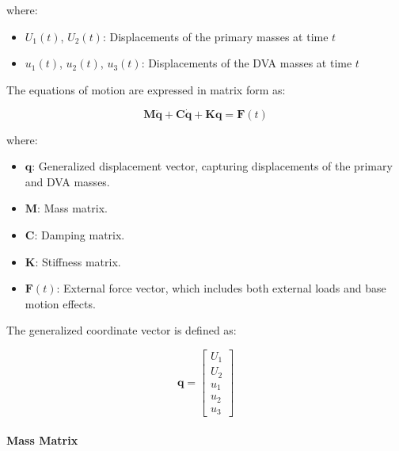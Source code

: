 \documentclass[12pt,a4paper]{article}
\begin{document}
where:
\begin{itemize}
    \item $U_1(t)$, $U_2(t)$: Displacements of the primary masses at time $t$
    \item $u_1(t)$, $u_2(t)$, $u_3(t)$: Displacements of the DVA masses at time $t$
\end{itemize}

The equations of motion are expressed in matrix form as:

\begin{equation} \label{Eq.EOM_dimensional_combined}
    \mathbf{M} \ddot{\mathbf{q}} + \mathbf{C} \dot{\mathbf{q}} + \mathbf{K} \mathbf{q} = \mathbf{F}(t)
\end{equation}

where:

\begin{itemize}
    \item $\mathbf{q}$: Generalized displacement vector, capturing displacements of the primary and \gls{DVA} masses.
    \item $\mathbf{M}$: Mass matrix.
    \item $\mathbf{C}$: Damping matrix.
    \item $\mathbf{K}$: Stiffness matrix.
    \item $\mathbf{F}(t)$: External force vector, which includes both external loads and base motion effects.
\end{itemize}

The generalized coordinate vector is defined as:

\begin{equation}\label{Eq.generalized_coordinate_combined}
    \mathbf{q} = 
  \begin{bmatrix}
    U_1 \\ U_2 \\ u_1 \\ u_2 \\ u_3
  \end{bmatrix}
\end{equation}

\paragraph{Mass Matrix}
\end{document}
